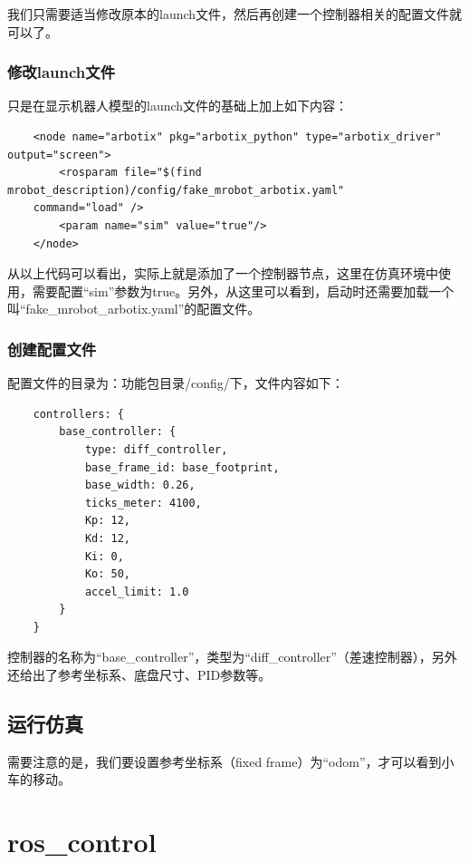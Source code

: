 \documentclass[10pt, oneside]{book}
\begin{document}
我们只需要适当修改原本的launch文件，然后再创建一个控制器相关的配置文件就可以了。

\subsubsection{修改launch文件}

只是在显示机器人模型的launch文件的基础上加上如下内容：

\begin{verbatim}
    <node name="arbotix" pkg="arbotix_python" type="arbotix_driver" output="screen">
        <rosparam file="$(find mrobot_description)/config/fake_mrobot_arbotix.yaml" 
    command="load" />
        <param name="sim" value="true"/>
    </node>
\end{verbatim}

从以上代码可以看出，实际上就是添加了一个控制器节点，这里在仿真环境中使用，需要配置“sim”参数为true。另外，从这里可以看到，启动时还需要加载一个叫“fake\_mrobot\_arbotix.yaml”的配置文件。

\subsubsection{创建配置文件}

配置文件的目录为：功能包目录/config/下，文件内容如下：

\begin{verbatim}
    controllers: {
        base_controller: {
            type: diff_controller, 
            base_frame_id: base_footprint, 
            base_width: 0.26, 
            ticks_meter: 4100, 
            Kp: 12, 
            Kd: 12, 
            Ki: 0, 
            Ko: 50, 
            accel_limit: 1.0 
        }
    }
\end{verbatim}

控制器的名称为“base\_controller”，类型为“diff\_controller”（差速控制器），另外还给出了参考坐标系、底盘尺寸、PID参数等。

\subsection{运行仿真}

需要注意的是，我们要设置参考坐标系（fixed frame）为“odom”，才可以看到小车的移动。

\section{ros\_control}
\end{document}
